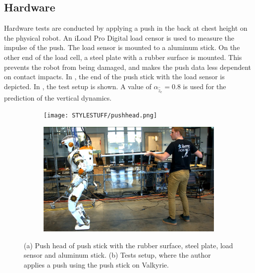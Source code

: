 \subsection{Hardware} 
Hardware tests are conducted by applying a push in the back at chest height on the physical robot. An iLoad Pro Digital load censor is used to measure the impulse of the push. The load sensor is mounted to a aluminum stick. On the other end of the load cell, a steel plate with a rubber surface is mounted. This prevents the robot from being damaged, and makes the push data less dependent on contact impacts. In , the end of the push stick with the load sensor is depicted. In , the test setup is shown. A value of $\alpha_{\hat{\ddot{z}}_{c}}=0.8$ is used for the prediction of the vertical dynamics. 
\begin{figure}[h]
\centering
  \begin{subfigure}{0.495\textwidth}
  \centering
  \texttt{[image: STYLESTUFF/pushhead.png]}
   \caption{}
    \label{fig:pushhead}
  \end{subfigure}
  \begin{subfigure}{0.495\textwidth}
    \centering
  \includegraphics[width=.94\linewidth]{STYLESTUFF/authorpush.png}
  \caption{}
   \label{fig:authorpush}
  \end{subfigure}
  \caption{(a) Push head of push stick with the rubber surface, steel plate, load sensor and aluminum stick. (b) Tests setup, where the author applies a push using the push stick on Valkyrie.}
  \label{fig:pushsetup}
\end{figure}

